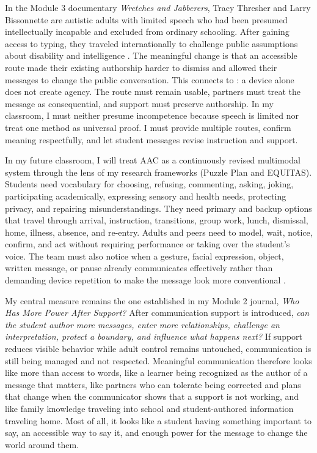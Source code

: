 
In the Module 3 documentary \textit{Wretches and Jabberers}, Tracy Thresher and Larry Bissonnette are autistic adults with limited speech who had been presumed intellectually incapable and excluded from ordinary schooling. After gaining access to typing, they traveled internationally to challenge public assumptions about disability and intelligence \citep{wurzburg2013wretches}. The meaningful change is that an accessible route made their existing authorship harder to dismiss and allowed their messages to change the public conversation. This connects to \citet{norrie2021context}: a device alone does not create agency. The route must remain usable, partners must treat the message as consequential, and support must preserve authorship. In my classroom, I must neither presume incompetence because speech is limited nor treat one method as universal proof. I must provide multiple routes, confirm meaning respectfully, and let student messages revise instruction and support.


In my future classroom, I will treat AAC as a continuously revised multimodal system through the lens of my research frameworks (Puzzle Plan and EQUITAS). Students need vocabulary for choosing, refusing, commenting, asking, joking, participating academically, expressing sensory and health needs, protecting privacy, and repairing misunderstandings. They need primary and backup options that travel through arrival, instruction, transitions, group work, lunch, dismissal, home, illness, absence, and re-entry. Adults and peers need to model, wait, notice, confirm, and act without requiring performance or taking over the student's voice. The team must also notice when a gesture, facial expression, object, written message, or pause already communicates effectively rather than demanding device repetition to make the message look more conventional \citep{mirenda2015aids}.

My central measure remains the one established in my Module 2 journal, \textit{Who Has More Power After Support?} After communication support is introduced, \textit{can the student author more messages, enter more relationships, challenge an interpretation, protect a boundary, and influence what happens next?} If support reduces visible behavior while adult control remains untouched, communication is still being managed and not respected. Meaningful communication therefore looks like more than access to words, like a learner being recognized as the author of a message that matters, like partners who can tolerate being corrected and plans that change when the communicator shows that a support is not working, and like family knowledge traveling into school and student-authored information traveling home. Most of all, it looks like a student having something important to say, an accessible way to say it, and enough power for the message to change the world around them.
